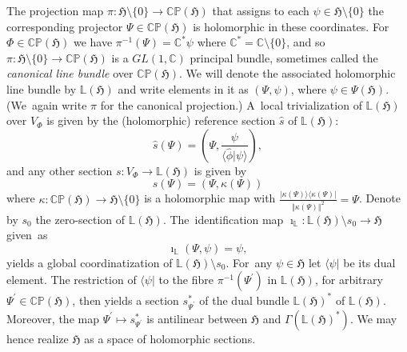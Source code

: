 \documentclass[11pt]{amsart}
\numberwithin{equation}{section}
\theoremstyle{remark}
\newcommand\HH{\mathfrak H}
\newcommand{\prhs}{{\mathbb C\mathbb P}( \HH)}
\newcommand{\C}{\mathbb C}
\begin{document}
The projection map $\pi : {\HH}\setminus\{ 0 \}  \to \prhs$  that assigns to
each $\psi \in {\HH}\setminus\{ 0\}$ the corresponding  projector $\Psi \in
\prhs$ is holomorphic in these coordinates. For $\Phi \in \prhs$ we have
$\pi^{-1}(\Psi) = {\C}^\ast \psi$ where $ {\C}^\ast=  {\C} \setminus \{0\}$,
and so  $\pi : {\HH} \setminus \{ 0\} \to \prhs$ is a $GL(1, {\C})$ principal
bundle, sometimes called the {\em canonical line bundle} over  $\prhs$. We will
denote the associated holomorphic line bundle by $\mathbb L(\HH)$ and write
elements in it as $(\Psi,\psi)$, where $\psi \in \Psi(\HH )$. (We~again write
$\pi$ for the canonical projection.) A~local trivialization of $\mathbb L(\HH)$
over $V_\Phi$ is given by the (holomorphic) reference section  $\hat s$ of
$\mathbb L(\HH)$:
\begin{equation}\label{unitsec}
  \hat s(\Psi) =(\Psi,\frac{\psi }{\langle\hat\phi\vert\psi \rangle}),
\end{equation}
and any other section $s: V_\Phi \to \mathbb L(\HH)$ is given by
\begin{equation}\label{kap}
s(\Psi) = (\Psi, \kappa(\Psi))
\end{equation}
where $\kappa : \prhs \to \HH \setminus \{0\}$ is a holomorphic map with
$\frac{\vert \kappa(\Psi) \rangle \langle \kappa(\Psi)\vert}{\Vert\kappa(\Psi)
\Vert^2} = \Psi$. Denote by $s_0$ the zero-section of $\mathbb L(\HH)$.
The~identification map $\imath_\mathbb L : \mathbb L(\HH) \setminus s_0\to \HH$
given~as
\begin{equation}\label{id}
\imath_\mathbb L (\Psi,\psi) = \psi ,
\end{equation}
yields a global coordinatization of $\mathbb L(\HH) \setminus s_0$.
For~any $\psi \in \HH$ let $\langle \psi \vert$ be its dual element.
The restriction of
$\langle \psi \vert$ to the fibre $\pi^{-1} (\Psi^\prime)$ in $\mathbb L(\HH)$,
for arbitrary
$\Psi^\prime \in \prhs$, then
yields a section $s^*_{\Psi^\prime}$ of the  dual bundle
$\mathbb L(\HH)^*$ of  $\mathbb L(\HH)$.
Moreover, the map $\Psi^\prime \mapsto  s^*_{\Psi^\prime}$ is antilinear
between  $\HH$ and
$\Gamma(\mathbb L(\HH)^*)$.  We may hence realize $\HH$ as a space of
holomorphic sections.
\end{document}

